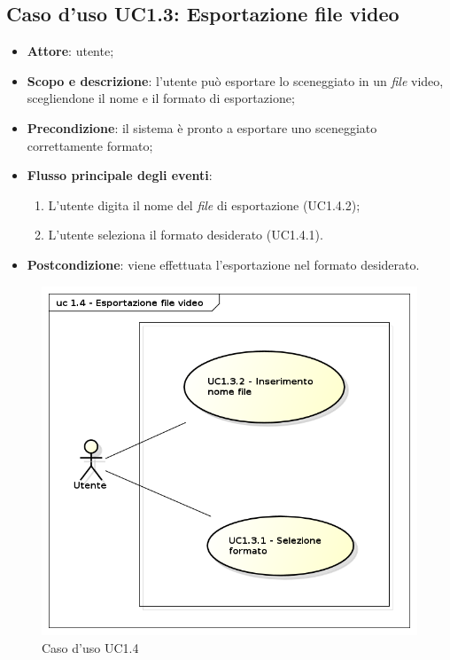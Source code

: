 \subsection{Caso d'uso UC1.3: Esportazione file video}
\label{sec:UC1.3}

\begin{itemize}
\item \textbf{Attore}: utente;
\item \textbf{Scopo e descrizione}: l'utente può esportare lo sceneggiato in un \textit{file} video, scegliendone il nome e il formato di esportazione;
\item \textbf{Precondizione}: il sistema è pronto a esportare uno sceneggiato correttamente formato;
\item \textbf{Flusso principale degli eventi}:
\begin{enumerate}
\item L'utente digita il nome del \textit{file} di esportazione (UC1.4.2);
\item L'utente seleziona il formato desiderato (UC1.4.1).
\end{enumerate} 
\item \textbf{Postcondizione}: viene effettuata l'esportazione nel formato desiderato.  
\end{itemize}
\begin{figure}[htbp]
\centering
\includegraphics[scale=0.5]{immagini/uc1_4_esportazione_video.png}
\captionsetup{labelfont=bf}
\caption{Caso d'uso UC1.4}
\end{figure}
\newpage


